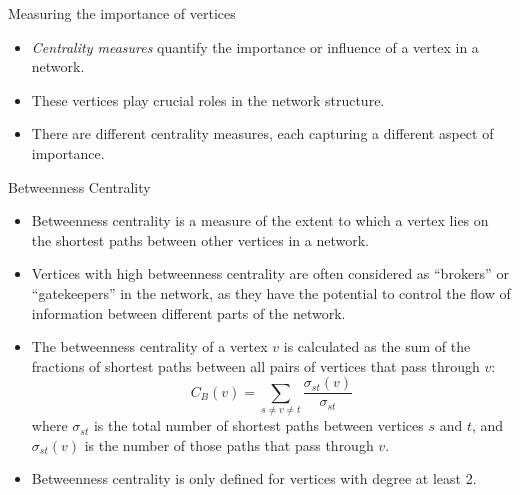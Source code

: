 \documentclass[9pt,handout]{beamer}
\let\olditem\item
\renewcommand{\item}{\olditem\vfill}
\begin{document}
\begin{frame}{Measuring the importance of vertices}
  \begin{itemize}
    \item \emph{Centrality measures} quantify the importance or influence of a vertex in a network. 
    \item These vertices play crucial roles in the network structure.
    \item There are different centrality measures, each capturing a different aspect of importance.
  \end{itemize}
\end{frame}

\begin{frame}{Betweenness Centrality}
  \begin{itemize}
    \item Betweenness centrality is a measure of the extent to which a vertex lies on the shortest paths between other vertices in a network.
    \item Vertices with high betweenness centrality are often considered as ``brokers'' or ``gatekeepers'' in the network, as they have the potential to control the flow of information between different parts of the network.
    \item The betweenness centrality of a vertex $v$ is calculated as the sum of the fractions of shortest paths between all pairs of vertices that pass through $v$:
    \[
    C_B(v) = \sum_{s \neq v \neq t} \frac{\sigma_{st}(v)}{\sigma_{st}}
    \]
    where $\sigma_{st}$ is the total number of shortest paths between vertices $s$ and $t$, and $\sigma_{st}(v)$ is the number of those paths that pass through $v$.
    \item Betweenness centrality is only defined for vertices with degree at least 2.
  \end{itemize}
\end{frame}
\end{document}
